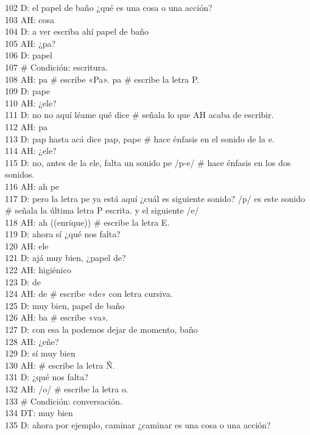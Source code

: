 102 D: el papel de baño ¿qué es una cosa o una acción?\\
103 AH: cosa\\
104 D: a ver escriba ahí papel de baño\\
105 AH: ¿pa?\\
106 D: papel\\
107 \# Condición: escritura.\\
108 AH: pa \# escribe «Pa». pa \# escribe la letra P.\\
109 D: pape\\
110 AH: ¿ele?\\
111 D: no no aquí léame qué dice \# señala lo que AH acaba de escribir.\\
112 AH: pa\\
113 D: pap hasta acá dice pap, pape \# hace énfasis en el sonido de la e.\\
114 AH: ¿ele?\\
115 D: no, antes de la ele, falta un sonido pe /p-e/ \# hace énfasis en los dos sonidos.\\
116 AH: ah pe\\
117 D: pero la letra pe ya está aquí ¿cuál es siguiente sonido? /p/ es este sonido \# señala la última letra P escrita. y el siguiente /e/\\
118 AH: ah ((enrique)) \# escribe la letra E.\\
119 D: ahora sí ¿qué nos falta?\\
120 AH: ele\\
121 D: ajá muy bien, ¿papel de?\\
122 AH: higiénico\\
123 D: de\\
124 AH: de \# escribe «de» con letra cursiva.\\
125 D: muy bien, papel de baño\\
126 AH: ba \# escribe «va».\\
127 D: con esa la podemos dejar de momento, baño\\
128 AH: ¿eñe?\\
129 D: sí muy bien\\
130 AH: \# escribe la letra Ñ.\\
131 D: ¿qué nos falta?\\
132 AH: /o/ \# escribe la letra o.\\
133 \# Condición: conversación.\\
134 DT: muy bien\\
135 D: ahora por ejemplo, caminar ¿caminar es una cosa o una acción?\\
